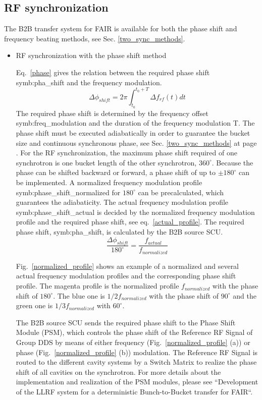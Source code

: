 \subsection{RF synchronization}
The B2B transfer system for FAIR is available for both the phase shift and frequency beating methods, see Sec. \ref{two_sync_methods}.
\begin{itemize}
\item RF synchronization with the phase shift method

Eq.~\ref{phase} gives the relation between the required phase shift \gls{symb:pha_shift} and the frequency modulation. 
\begin{equation}
\Delta \phi_{shift}= 2\pi \int_{t_0}^{t_0+T} \Delta f_{rf}(t)dt \label{phase}
\end{equation}
The required phase shift is determined by the frequency offset \gls{symb:freq_modulation} and the duration of the frequency modulation T. The phase shift must be executed adiabatically in order to guarantee the bucket size and continuous synchronous phase, see Sec. \ref{two_sync_methods} at page \pageref{3_criteria}. For the RF synchronization, the maximum phase shift required of one synchrotron is one bucket length of the other synchrotron, $360^\circ$. Because the phase can be shifted backward or forward, a phase shift of up to $\pm 180^\circ$ can be implemented. A normalized frequency modulation profile \gls{symb:phase_shift_normalized} for $180^\circ$ can be precalculated, which guarantees the adiabaticity. The actual frequency modulation profile \gls{symb:phase_shift_actual} is decided by the normalized frequency modulation profile and the required phase shift, see eq.~\ref{actual_profile}. The required phase shift, \gls{symb:pha_shift}, is calculated by the B2B source SCU.
\begin{equation}
\frac{\Delta \phi_{shift}}{180^\circ}= \frac{f_{actual}}{f_{normalized}} \label{actual_profile}
\end{equation}

Fig.~\ref{normalized_profile} shows an example of a normalized and several actual frequency  modulation profiles and the corresponding phase shift profile. The magenta profile is the normalized profile $f_{normalized}$ with the phase shift of $180^\circ$. The blue one is $1/2f_{normalized}$ with the phase shift of $90^\circ$ and the green one is $1/3f_{normalized}$ with $60^\circ$. 

The B2B source SCU sends the required phase shift to the Phase Shift Module (\gls{PSM}), which controls the phase shift of the Reference RF Signal of Group DDS by means of either frequency (Fig.~\ref{normalized_profile} (a)) or phase (Fig.~\ref{normalized_profile} (b)) modulation. The Reference RF Signal is routed to the different cavity systems by a Switch Matrix to realize the phase shift of all cavities on the synchrotron. For more details about the implementation and realization of the PSM modules, please see ``Development of the LLRF system for a deterministic Bunch-to-Bucket transfer for FAIR``.
                       

\end{itemize}
